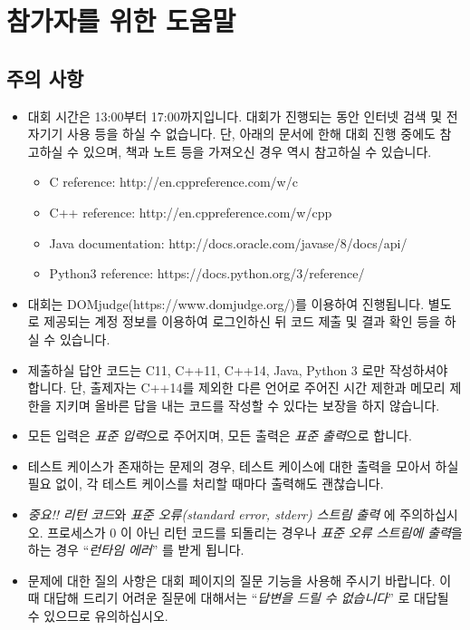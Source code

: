 \section*{참가자를 위한 도움말}

\subsection*{주의 사항}

\begin{itemize}
\item 대회 시간은 13:00부터 17:00까지입니다. 대회가 진행되는 동안 인터넷 검색 및 전자기기 사용 등을 하실 수 없습니다. 단, 아래의 문서에 한해 대회 진행 중에도 참고하실 수 있으며, 책과 노트 등을 가져오신 경우 역시 참고하실 수 있습니다.
\begin{itemize}
  \item C reference: http://en.cppreference.com/w/c
  \item C++ reference: http://en.cppreference.com/w/cpp
  \item Java documentation: http://docs.oracle.com/javase/8/docs/api/
  \item Python3 reference: https://docs.python.org/3/reference/
\end{itemize}
\item 대회는 DOMjudge(https://www.domjudge.org/)를 이용하여 진행됩니다. 별도로 제공되는 계정 정보를 이용하여 로그인하신 뒤 코드 제출 및 결과 확인 등을 하실 수 있습니다.
\item 제출하실 답안 코드는 C11, C++11, C++14, Java, Python 3 로만 작성하셔야 합니다. 단, 출제자는 C++14를 제외한 다른 언어로 주어진 시간 제한과 메모리 제한을 지키며 올바른 답을 내는 코드를 작성할 수 있다는 보장을 하지 않습니다.
\item 모든 입력은 \emph{표준 입력}으로 주어지며, 모든 출력은 \emph{표준 출력}으로 합니다.
\item 테스트 케이스가 존재하는 문제의 경우, 테스트 케이스에 대한 출력을 모아서 하실 필요 없이, 각 테스트 케이스를 처리할 때마다 출력해도 괜찮습니다.
\item \emph{중요!!} \emph{리턴 코드}와 \emph{표준 오류(standard error, stderr) 스트림 출력} 에 주의하십시오. 프로세스가 $0$ 이 아닌 리턴 코드를 되돌리는 경우나 \emph{표준 오류 스트림에 출력}을 하는 경우 ``\emph{런타임 에러}'' 를 받게 됩니다.
\item 문제에 대한 질의 사항은 대회 페이지의 질문 기능을 사용해 주시기 바랍니다. 이 때 대답해 드리기 어려운 질문에 대해서는 ``\emph{답변을 드릴 수 없습니다}'' 로 대답될 수 있으므로 유의하십시오.
\end{itemize}


